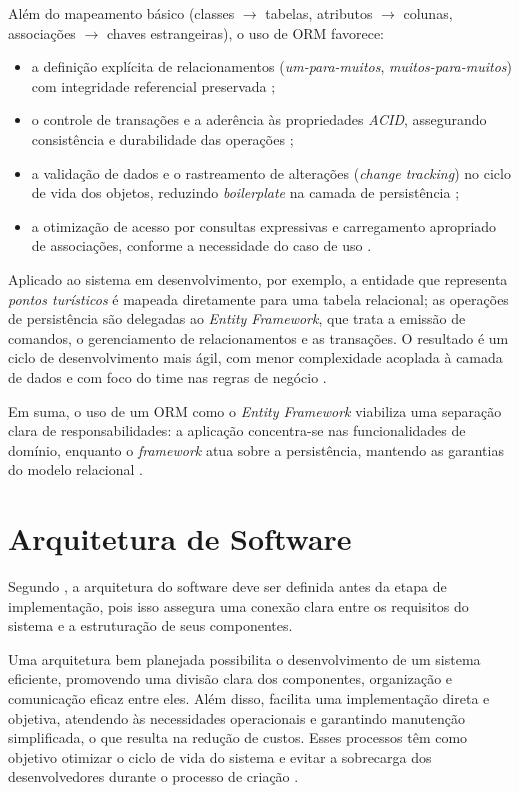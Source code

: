 Além do mapeamento básico (classes $\rightarrow$ tabelas, atributos $\rightarrow$ colunas, associações $\rightarrow$ chaves estrangeiras), o uso de ORM favorece:
\begin{itemize}
	\item a definição explícita de relacionamentos (\emph{um-para-muitos}, \emph{muitos-para-muitos})
	com integridade referencial preservada \parencite{Silberschatz2012};
	\item o controle de transações e a aderência às propriedades \emph{ACID}, assegurando consistência
	e durabilidade das operações \parencite{Silberschatz2012};
	\item a validação de dados e o rastreamento de alterações (\emph{change tracking}) no ciclo de vida
	dos objetos, reduzindo \emph{boilerplate} na camada de persistência \parencite{Silberschatz2012};
	\item a otimização de acesso por consultas expressivas e carregamento apropriado de associações,
	conforme a necessidade do caso de uso \parencite{Silberschatz2012}.
\end{itemize}

Aplicado ao sistema em desenvolvimento, por exemplo, a entidade que representa \emph{pontos turísticos}
é mapeada diretamente para uma tabela relacional; as operações de persistência são delegadas ao
\emph{Entity Framework}, que trata a emissão de comandos, o gerenciamento de relacionamentos e as
transações. O resultado é um ciclo de desenvolvimento mais ágil, com menor complexidade acoplada à
camada de dados e com foco do time nas regras de negócio \parencite{Silberschatz2012}.

Em suma, o uso de um ORM como o \emph{Entity Framework} viabiliza uma separação clara de
responsabilidades: a aplicação concentra-se nas funcionalidades de domínio, enquanto o \emph{framework}
atua sobre a persistência, mantendo as garantias do modelo relacional \parencite{Silberschatz2012}.


\chapter{Arquitetura de Software}

Segundo \textcite{Sommerville2018ES10}, a arquitetura do software deve ser definida antes da etapa de implementação, pois isso assegura uma conexão clara entre os requisitos do sistema e a estruturação de seus componentes.

Uma arquitetura bem planejada possibilita o desenvolvimento de um sistema eficiente, promovendo uma divisão clara dos componentes, organização e comunicação eficaz entre eles. Além disso, facilita uma implementação direta e objetiva, atendendo às necessidades operacionais e garantindo manutenção simplificada, o que resulta na redução de custos. Esses processos têm como objetivo otimizar o ciclo de vida do sistema e evitar a sobrecarga dos desenvolvedores durante o processo de criação \cite{Martin2020CleanArchPT}.

